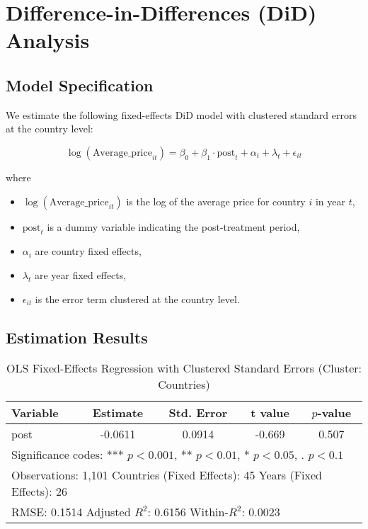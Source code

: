 \documentclass{article}
\begin{document}
\section*{Difference-in-Differences (DiD) Analysis}

\subsection*{Model Specification}

We estimate the following fixed-effects DiD model with clustered standard errors at the country level:

\[
\log(\text{Average\_price}_{it}) = \beta_0 + \beta_1 \cdot \text{post}_t + \alpha_i + \lambda_t + \epsilon_{it}
\]

where
\begin{itemize}
    \item $\log(\text{Average\_price}_{it})$ is the log of the average price for country $i$ in year $t$,
    \item $\text{post}_t$ is a dummy variable indicating the post-treatment period,
    \item $\alpha_i$ are country fixed effects,
    \item $\lambda_t$ are year fixed effects,
    \item $\epsilon_{it}$ is the error term clustered at the country level.
\end{itemize}

\bigskip

\subsection*{Estimation Results}

\begin{table}[ht]
\centering
\caption{OLS Fixed-Effects Regression with Clustered Standard Errors (Cluster: Countries)}
\begin{tabular}{lcccc}
\toprule
Variable & Estimate & Std. Error & t value & $p$-value \\
\midrule
post & -0.0611 & 0.0914 & -0.669 & 0.507 \\
\bottomrule
\multicolumn{5}{l}{\footnotesize{Significance codes: *** $p<0.001$, ** $p<0.01$, * $p<0.05$, . $p<0.1$}} \\
\multicolumn{5}{l}{Observations: 1,101 \quad Countries (Fixed Effects): 45 \quad Years (Fixed Effects): 26} \\
\multicolumn{5}{l}{RMSE: 0.1514 \quad Adjusted $R^2$: 0.6156 \quad Within-$R^2$: 0.0023} \\
\end{tabular}
\label{tab:did_results}
\end{table}
\end{document}
